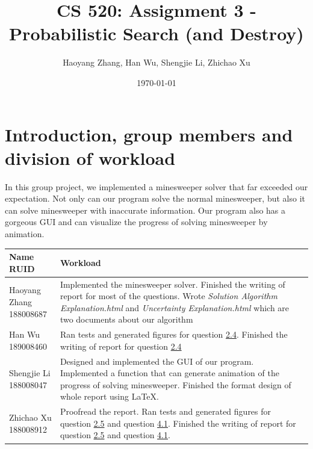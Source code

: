 \documentclass[letter]{article}
\title{CS 520: Assignment 3 - Probabilistic Search (and Destroy)}
\author{Haoyang Zhang, Han Wu, Shengjie Li, Zhichao Xu}
\date{\today}
\begin{document}
\maketitle

\section{Introduction, group members and division of workload}
\label{sec:Introduction}

In this group project, we implemented a minesweeper solver that far exceeded our expectation. Not only can our program solve the normal minesweeper, but also it can solve minesweeper with inaccurate information. Our program also has a gorgeous GUI and can visualize the progress of solving minesweeper by animation. \\
\begin{tabular}{| p{2.5cm} | p{\textwidth -3.5cm} |}
	\hline
	\makecell[c]{Name \\ RUID} & Workload \\
	\hline
	\makecell[c]{Haoyang Zhang \\ 188008687} & {Implemented the minesweeper solver. Finished the writing of report for most of the questions. Wrote \textit{Solution Algorithm Explanation.html} and \textit{Uncertainty Explanation.html} which are two documents about our algorithm} \\
	\hline
	\makecell[c]{Han Wu \\ 189008460} & {Ran tests and generated figures for question \hyperref[han]{2.4}. Finished the writing of report for question \hyperref[han]{2.4}} \\
	\hline
	\makecell[c]{Shengjie Li \\ 188008047} & {Designed and implemented the GUI of our program. Implemented a function that can generate animation of the progress of solving minesweeper. Finished the format design of whole report using \LaTeX. } \\
	\hline
	\makecell[c]{Zhichao Xu \\ 188008912} & {Proofread the report. Ran tests and generated figures for question \hyperref[zhichao1]{2.5} and question \hyperref[zhichao2]{4.1}. Finished the writing of report for question \hyperref[zhichao1]{2.5} and question \hyperref[zhichao2]{4.1}.} \\
	\hline
\end{tabular}
\end{document}
